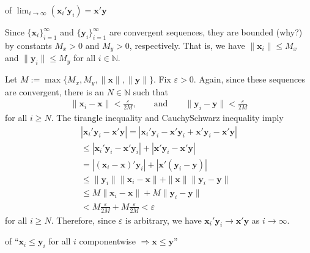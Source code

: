 \documentclass[letterpaper,10pt,english]{jupyterBook}
\begin{document}
\sphinxAtStartPar
{} of \(\lim_{i \to \infty} (\mathbf{x}_i' \mathbf{y}_i) = \mathbf{x}' \mathbf{y}\)

\sphinxAtStartPar
Since \(\{\mathbf{x}_i\}_{i=1}^\infty\) and \(\{\mathbf{y}_i\}_{i=1}^\infty\) are convergent sequences, they are bounded (why?) by constants \(M_x > 0\) and \(M_y >0\), respectively.
That is, we have \(\|\mathbf{x}_i\|\leq M_x\) and \(\|\mathbf{y}_i\|\leq M_y\) for all \(i\in\mathbb{N}\).

\sphinxAtStartPar
Let \(M:= \max\{M_x, M_y, \|\mathbf{x}\|, \|\mathbf{y}\|\}\).
Fix \(\varepsilon > 0\).
Again, since these sequences are convergent, there is an \(N \in \mathbb{N}\) such that
\begin{equation*}
\begin{split}
\|\mathbf{x}_i - \mathbf{x}\| < \frac{\varepsilon}{2M}, \qquad \text{and} \qquad \|\mathbf{y}_i - \mathbf{y}\| < \frac{\varepsilon}{2M}
\end{split}
\end{equation*}
\sphinxAtStartPar
for all \(i \geq N\).
The tirangle inequality and Cauchy\sphinxhyphen{}Schwarz inequality imply
\begin{equation*}
\begin{split}
|\mathbf{x}_i' \mathbf{y}_i - \mathbf{x}'\mathbf{y}| 
= |\mathbf{x}_i' \mathbf{y}_i - \mathbf{x}' \mathbf{y}_i + \mathbf{x}' \mathbf{y}_i - \mathbf{x}'\mathbf{y}| \\
\leq |\mathbf{x}_i' \mathbf{y}_i - \mathbf{x}' \mathbf{y}_i| + |\mathbf{x}' \mathbf{y}_i - \mathbf{x}'\mathbf{y}| \\
= |(\mathbf{x}_i - \mathbf{x})' \mathbf{y}_i| + |\mathbf{x}'(\mathbf{y}_i-\mathbf{y})| \\
\leq \|\mathbf{y}_i\| \|\mathbf{x}_i-\mathbf{x}\| + \|\mathbf{x}\|\|\mathbf{y}_i - \mathbf{y}\| \\
\leq M \|\mathbf{x}_i - \mathbf{x}\| + M \|\mathbf{y}_i - \mathbf{y}\| \\
< M \frac{\varepsilon}{2M}+ M \frac{\varepsilon}{2M}< \varepsilon
\end{split}
\end{equation*}
\sphinxAtStartPar
for all \(i \geq N\).
Therefore, since \(\varepsilon\) is arbitrary, we have \(\mathbf{x}_i'\mathbf{y}_i \to \mathbf{x}'\mathbf{y}\) as \(i \to \infty\).

\sphinxAtStartPar
{} of “\(\mathbf{x}_i \leq \mathbf{y}_i\) for all \(i\) component\sphinxhyphen{}wise \(\Longrightarrow \mathbf{x} \leq \mathbf{y}\)”
\end{document}
